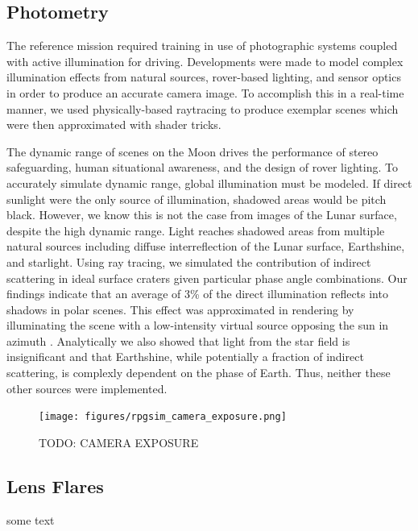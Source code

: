 \documentclass[twocolumn,letterpaper]{IEEEAerospaceCLS}  %
\begin{document}
\subsection {Photometry}
The reference mission required training in use of photographic systems coupled with active illumination for driving. 
Developments were made to model complex illumination effects from natural sources, rover-based lighting, and sensor optics in order to produce an accurate camera image. 
To accomplish this in a real-time manner, we used physically-based raytracing to produce exemplar scenes which were then approximated with shader tricks. 

The dynamic range of scenes on the Moon drives the performance of stereo safeguarding, human situational awareness, and the design of rover lighting. 
To accurately simulate dynamic range, global illumination must be modeled. 
If direct sunlight were the only source of illumination, shadowed areas would be pitch black. 
However, we know this is not the case from images of the Lunar surface, despite the high dynamic range. 
Light reaches shadowed areas from multiple natural sources including diffuse interreflection of the Lunar surface, Earthshine, and starlight. 
Using ray tracing, we simulated the contribution of indirect scattering in ideal surface craters given particular phase angle combinations. 
Our findings indicate that an average of 3\% of the direct illumination reflects into shadows in polar scenes. 
This effect was approximated in rendering by illuminating the scene with a low-intensity virtual source opposing the sun in azimuth . 
Analytically we also showed that light from the star field is insignificant and that Earthshine, while potentially a fraction of indirect scattering, is complexly dependent on the phase of Earth. 
Thus, neither these other sources were implemented.       

\begin{figure}[h!]
	\texttt{[image: figures/rpgsim\_camera\_exposure.png]}
   	\caption{TODO: CAMERA EXPOSURE}
    \label{fig:cameraexposure}
\end{figure}

\subsection{Lens Flares}
some text
\end{document}
